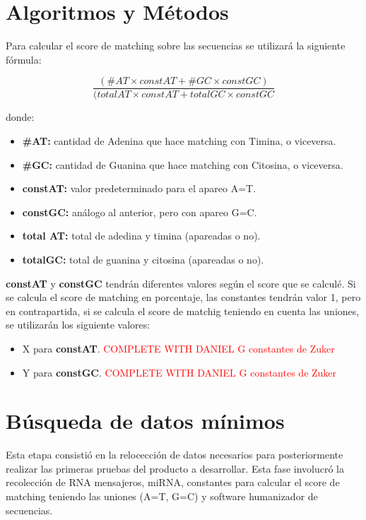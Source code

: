 \documentclass[12pt,a4paper,spanish]{article}
\begin{document}
\section{Algoritmos y Métodos}
	\par Para calcular el score de matching sobre las secuencias se utilizará la siguiente fórmula:

		\begin{equation}	
			\frac{(\#AT \times constAT + \#GC \times constGC)}{(totalAT \times constAT + totalGC \times constGC}
		\end{equation}	

		\par donde:
		\begin{itemize}
			\item \textbf{\#AT:} cantidad de Adenina que hace matching con Timina, o viceversa.
			\item \textbf{\#GC:} cantidad de Guanina que hace matching con Citosina, o viceversa.
			\item \textbf{constAT:} valor predeterminado para el apareo A=T.
			\item \textbf{constGC:} análogo al anterior, pero con apareo G=C.
			\item \textbf{total AT:} total de adedina y timina (apareadas o no).
			\item \textbf{totalGC:} total de guanina y citosina (apareadas o no).	
		\end{itemize}

	\par \textbf{constAT} y \textbf{constGC} tendrán diferentes valores según el score que se calculé. Si se calcula el score de matching en porcentaje, las constantes tendrán valor 1, pero en contrapartida, si se calcula el score de matchig teniendo en cuenta las uniones, se utilizarán los siguiente valores:
	\begin{itemize}
		\item X para \textbf{constAT}. \textcolor{red}{COMPLETE WITH DANIEL G constantes de Zuker}
		\item Y para \textbf{constGC}. \textcolor{red}{COMPLETE WITH DANIEL G constantes de Zuker}
	\end{itemize}

\section{Búsqueda de datos mínimos}
	\par Esta etapa consistió en la relocección de datos necesarios para posteriormente realizar las primeras pruebas del producto a desarrollar. Esta 		fase involucró la recolección de RNA mensajeros, miRNA, constantes para calcular el score de matching teniendo las uniones (A=T, G=C) y software 		humanizador de secuencias.
\end{document}

